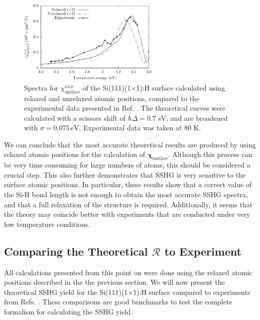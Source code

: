 \begin{figure}[t]
\centering
\includegraphics[width=0.6\textwidth]{content/figures/fig-Si1x1-Hofer_Xxxx}
\caption[$\chi^{xxx}_{\mathrm{surface}}$ calculated using relaxed and unrelaxed
atomic positions.] {Spectra for $\chi^{xxx}_{\mathrm{surface}}$ of the
Si(111)(1$\times$1):H surface calculated using relaxed and unrelaxed atomic
positions, compared to the experimental data presented in Ref.
\cite{hoferAPA96}. The theoretical curves were calculated with a scissors shift
of $\hbar\Delta = 0.7$ eV, and are broadened with $\sigma=0.075\,\text{eV}$.
Experimental data was taken at 80 K.}
\label{fig:Xxxx}
\end{figure}

We can conclude that the most accurate theoretical results are produced by using
relaxed atomic positions for the calculation of
$\boldsymbol{\chi}_{\mathrm{surface}}$. Although this process can be very time
consuming for large numbers of atoms, this should be considered a crucial step.
This also further demonstrates that SSHG is very sensitive to the surface atomic
positions. In particular, these results show that a correct value of the Si-H
bond length is not enough to obtain the most accurate SSHG spectra, and that a
full relaxation of the structure is required. Additionally, it seems that the
theory may coincide better with experiments that are conducted under very low
temperature conditions.



\subsection{Comparing the Theoretical \texorpdfstring{$\mathcal{R}$}{R} to
Experiment}
\label{sec:1x1sshgyield}

All calculations presented from this point on were done using the relaxed atomic
positions described in the the previous section. We will now present the
theoretical SSHG yield for the Si(111)(1$\times$1):H surface compared to
experiments from Refs. \cite{mitchellSS01, mejiaPRB02, bergfeldPRL04}. These
comparisons are good benchmarks to test the complete formalism for calculating
the SSHG yield.

